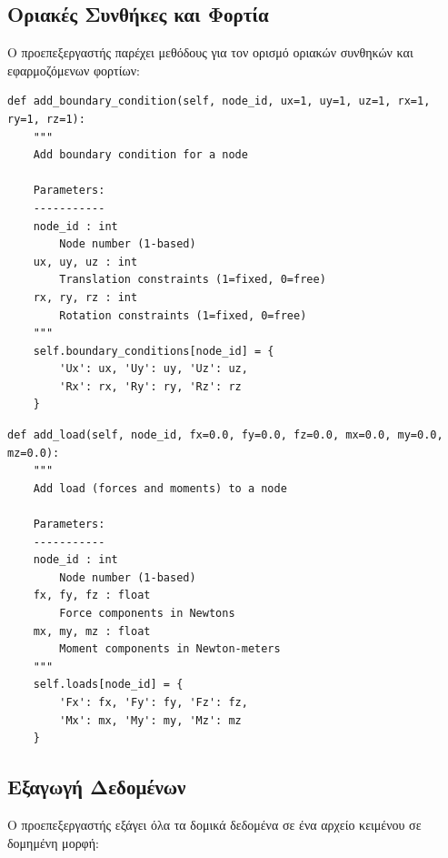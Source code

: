 \documentclass[12pt,a4paper]{article}
\begin{document}
\subsection{Οριακές Συνθήκες και Φορτία}

Ο προεπεξεργαστής παρέχει μεθόδους για τον ορισμό οριακών συνθηκών και εφαρμοζόμενων φορτίων:

\begin{lstlisting}[caption={Προσθήκη Οριακών Συνθηκών}]
def add_boundary_condition(self, node_id, ux=1, uy=1, uz=1, rx=1, ry=1, rz=1):
    """
    Add boundary condition for a node
    
    Parameters:
    -----------
    node_id : int
        Node number (1-based)
    ux, uy, uz : int
        Translation constraints (1=fixed, 0=free)
    rx, ry, rz : int
        Rotation constraints (1=fixed, 0=free)
    """
    self.boundary_conditions[node_id] = {
        'Ux': ux, 'Uy': uy, 'Uz': uz,
        'Rx': rx, 'Ry': ry, 'Rz': rz
    }
\end{lstlisting}

\begin{lstlisting}[caption={Προσθήκη Φορτίων}]
def add_load(self, node_id, fx=0.0, fy=0.0, fz=0.0, mx=0.0, my=0.0, mz=0.0):
    """
    Add load (forces and moments) to a node
    
    Parameters:
    -----------
    node_id : int
        Node number (1-based)
    fx, fy, fz : float
        Force components in Newtons
    mx, my, mz : float
        Moment components in Newton-meters
    """
    self.loads[node_id] = {
        'Fx': fx, 'Fy': fy, 'Fz': fz,
        'Mx': mx, 'My': my, 'Mz': mz
    }
\end{lstlisting}

\subsection{Εξαγωγή Δεδομένων}

Ο προεπεξεργαστής εξάγει όλα τα δομικά δεδομένα σε ένα αρχείο κειμένου σε δομημένη μορφή:
\end{document}
